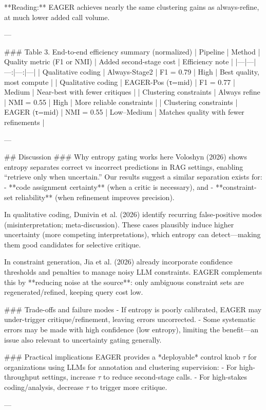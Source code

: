 **Reading:** EAGER achieves nearly the same clustering gains as always-refine, at much lower added call volume.

---

### Table 3. End-to-end efficiency summary (normalized)
| Pipeline | Method | Quality metric (F1 or NMI) | Added second-stage cost | Efficiency note |
|---|---|---:|---:|---|
| Qualitative coding | Always-Stage2 | F1 = 0.79 | High | Best quality, most compute |
| Qualitative coding | EAGER-Pos (τ=mid) | F1 = 0.77 | Medium | Near-best with fewer critiques |
| Clustering constraints | Always refine | NMI = 0.55 | High | More reliable constraints |
| Clustering constraints | EAGER (τ=mid) | NMI = 0.55 | Low–Medium | Matches quality with fewer refinements |

---

## Discussion
### Why entropy gating works here
Voloshyn (2026) shows entropy separates correct vs incorrect predictions in RAG settings, enabling “retrieve only when uncertain.” Our results suggest a similar separation exists for:
- **code assignment certainty** (when a critic is necessary), and
- **constraint-set reliability** (when refinement improves precision).

In qualitative coding, Dunivin et al. (2026) identify recurring false-positive modes (misinterpretation; meta-discussion). These cases plausibly induce higher uncertainty (more competing interpretations), which entropy can detect—making them good candidates for selective critique.

In constraint generation, Jia et al. (2026) already incorporate confidence thresholds and penalties to manage noisy LLM constraints. EAGER complements this by **reducing noise at the source**: only ambiguous constraint sets are regenerated/refined, keeping query cost low.

### Trade-offs and failure modes
- If entropy is poorly calibrated, EAGER may under-trigger critique/refinement, leaving errors uncorrected.
- Some systematic errors may be made with high confidence (low entropy), limiting the benefit—an issue also relevant to uncertainty gating generally.

### Practical implications
EAGER provides a *deployable* control knob \( \tau \) for organizations using LLMs for annotation and clustering supervision:
- For high-throughput settings, increase \( \tau \) to reduce second-stage calls.
- For high-stakes coding/analysis, decrease \( \tau \) to trigger more critique.

---

